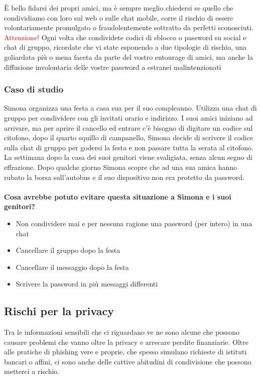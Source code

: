 \documentclass{article}
\begin{document}
È bello fidarsi dei propri amici, ma è sempre meglio chiedersi se quello che condividiamo con loro sul web o sulle chat mobile, corre il rischio di essere volontariamente promulgato o fraudolentemente sottratto da perfetti sconosciuti.\\
\textcolor{red}{Attenzione!} Ogni volta che condividete codici di sblocco o password su social e chat di gruppo, ricordate che vi state esponendo a due tipologie di rischio, una goliardata più o mena faceta da parte del vostro entourage di amici, ma anche la diffusione involontaria delle vostre password a estranei malintenzionati
\subsubsection{Caso di studio}
\label{sec:Caso5}
Simona organizza una festa a casa sua per il suo compleanno. Utilizza una chat di gruppo per condividere con gli invitati orario e indirizzo. I suoi amici iniziano ad arrivare, ma per aprire il cancello ed entrare c’è bisogno di digitare un codice sul citofono, dopo il quarto squillo di campanello, Simona decide di scrivere il codice sulla chat di gruppo per godersi la festa e non passare tutta la serata al citofono. La settimana dopo la casa dei suoi genitori viene svaligiata, senza alcun segno di effrazione. Dopo qualche giorno Simona scopre che ad una sua amica hanno rubato la borsa sull’autobus e il suo dispositivo non era protetto da password.
\\\vspace{5mm}\\
\textbf{Cosa avrebbe potuto evitare questa situazione a Simona e i suoi genitori?}
\begin{itemize}
	\item Non condividere mai e per nessuna ragione una password (per intero) in una chat
	\item Cancellare il gruppo dopo la festa
	\item Cancellare il messaggio dopo la festa
	\item Scrivere la password in più messaggi differenti
\end{itemize}
\subsection{Rischi per la privacy}
Tra le informazioni sensibili che ci riguardano ve ne sono alcune che possono causare problemi che vanno oltre la privacy e arrecare perdite finanziarie. Oltre alle pratiche di phishing vere e proprie, che spesso simulano richieste di istituti bancari o affini, ci sono anche delle cattive abitudini di condivisione che possono metterci a rischio.
\end{document}
